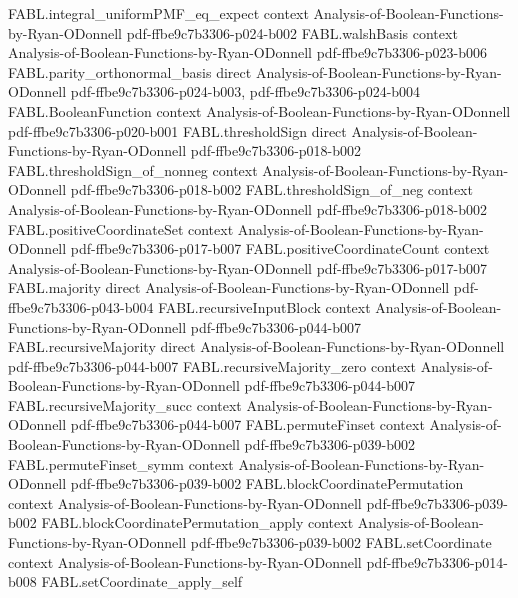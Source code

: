 \begin{theorem}
\proofstep
  {FABL.integral_uniformPMF_eq_expect}
  {context}
  {Analysis-of-Boolean-Functions-by-Ryan-ODonnell}
  {pdf-ffbe9c7b3306-p024-b002}
\proofstep
  {FABL.walshBasis}
  {context}
  {Analysis-of-Boolean-Functions-by-Ryan-ODonnell}
  {pdf-ffbe9c7b3306-p023-b006}
\proofstep
  {FABL.parity_orthonormal_basis}
  {direct}
  {Analysis-of-Boolean-Functions-by-Ryan-ODonnell}
  {pdf-ffbe9c7b3306-p024-b003,
    pdf-ffbe9c7b3306-p024-b004}
\proofstep
  {FABL.BooleanFunction}
  {context}
  {Analysis-of-Boolean-Functions-by-Ryan-ODonnell}
  {pdf-ffbe9c7b3306-p020-b001}
\proofstep
  {FABL.thresholdSign}
  {direct}
  {Analysis-of-Boolean-Functions-by-Ryan-ODonnell}
  {pdf-ffbe9c7b3306-p018-b002}
\proofstep
  {FABL.thresholdSign_of_nonneg}
  {context}
  {Analysis-of-Boolean-Functions-by-Ryan-ODonnell}
  {pdf-ffbe9c7b3306-p018-b002}
\proofstep
  {FABL.thresholdSign_of_neg}
  {context}
  {Analysis-of-Boolean-Functions-by-Ryan-ODonnell}
  {pdf-ffbe9c7b3306-p018-b002}
\proofstep
  {FABL.positiveCoordinateSet}
  {context}
  {Analysis-of-Boolean-Functions-by-Ryan-ODonnell}
  {pdf-ffbe9c7b3306-p017-b007}
\proofstep
  {FABL.positiveCoordinateCount}
  {context}
  {Analysis-of-Boolean-Functions-by-Ryan-ODonnell}
  {pdf-ffbe9c7b3306-p017-b007}
\proofstep
  {FABL.majority}
  {direct}
  {Analysis-of-Boolean-Functions-by-Ryan-ODonnell}
  {pdf-ffbe9c7b3306-p043-b004}
\proofstep
  {FABL.recursiveInputBlock}
  {context}
  {Analysis-of-Boolean-Functions-by-Ryan-ODonnell}
  {pdf-ffbe9c7b3306-p044-b007}
\proofstep
  {FABL.recursiveMajority}
  {direct}
  {Analysis-of-Boolean-Functions-by-Ryan-ODonnell}
  {pdf-ffbe9c7b3306-p044-b007}
\proofstep
  {FABL.recursiveMajority_zero}
  {context}
  {Analysis-of-Boolean-Functions-by-Ryan-ODonnell}
  {pdf-ffbe9c7b3306-p044-b007}
\proofstep
  {FABL.recursiveMajority_succ}
  {context}
  {Analysis-of-Boolean-Functions-by-Ryan-ODonnell}
  {pdf-ffbe9c7b3306-p044-b007}
\proofstep
  {FABL.permuteFinset}
  {context}
  {Analysis-of-Boolean-Functions-by-Ryan-ODonnell}
  {pdf-ffbe9c7b3306-p039-b002}
\proofstep
  {FABL.permuteFinset_symm}
  {context}
  {Analysis-of-Boolean-Functions-by-Ryan-ODonnell}
  {pdf-ffbe9c7b3306-p039-b002}
\proofstep
  {FABL.blockCoordinatePermutation}
  {context}
  {Analysis-of-Boolean-Functions-by-Ryan-ODonnell}
  {pdf-ffbe9c7b3306-p039-b002}
\proofstep
  {FABL.blockCoordinatePermutation_apply}
  {context}
  {Analysis-of-Boolean-Functions-by-Ryan-ODonnell}
  {pdf-ffbe9c7b3306-p039-b002}
\proofstep
  {FABL.setCoordinate}
  {context}
  {Analysis-of-Boolean-Functions-by-Ryan-ODonnell}
  {pdf-ffbe9c7b3306-p014-b008}
\proofstep
  {FABL.setCoordinate_apply_self}

\end{theorem}
